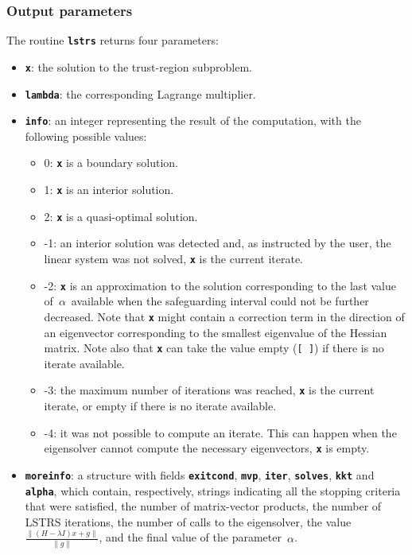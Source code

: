 \documentclass[acmtoms]{acmtrans2m}
\newcommand{\norm}{\|}
\newcommand{\hessian}{H}
\begin{document}
\subsubsection{Output parameters}\label{output}
The routine {\tt\bf lstrs} returns four parameters:

\begin{itemize}
\item {\tt\bf x}: the solution to the trust-region subproblem.

\item {\tt\bf lambda}: the corresponding Lagrange multiplier.

\item {\tt\bf info}: an integer representing the result of the computation, with the following possible values:
\begin{itemize}
\item[] 0:  {\tt\bf x} is a boundary solution.
\item[] 1:  {\tt\bf x} is an interior solution.
\item[] 2:  {\tt\bf x} is a quasi-optimal solution.
\item[] -1: an interior solution was detected and, as instructed by the user,
the linear system was not solved, {\tt\bf x} is the current iterate.
\item[] -2:  {\tt\bf x} is an approximation to the solution corresponding to
the last value of\ $\alpha$\ available when the safeguarding interval
could not be further decreased. Note that {\tt\bf x} might contain a correction
term in the direction of an eigenvector corresponding to the smallest eigenvalue of the Hessian matrix.
Note also that
{\tt\bf x} can take the value empty ({\tt [\ ]}) if there is no iterate available.
\item[] -3: the maximum number of iterations was reached, {\tt\bf x} is the current
iterate, or empty if there is no iterate available.
\item[] -4: it was not possible to compute an iterate. This can happen when
the eigensolver cannot compute the necessary eigenvectors, {\tt\bf x} is empty.
\end{itemize}

\item {\tt\bf moreinfo}: a structure with fields
{\tt\bf exitcond}, {\tt\bf mvp}, {\tt\bf iter}, {\tt\bf solves}, 
{\tt\bf kkt} and {\tt\bf alpha}, which contain, respectively, strings
indicating all the
stopping criteria that were satisfied, the number of matrix-vector products,
the number of LSTRS iterations, the number of calls to the eigensolver,
the value\ $\frac{\norm(\hessian-\lambda I)x + g\norm}{\norm g\norm}$,
and the final value of the parameter\ $\alpha$.
\end{itemize}
\end{document}
